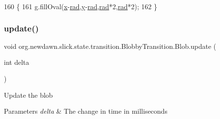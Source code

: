 \begin{DoxyCode}
160                                        \{
161             g.fillOval(\mbox{\hyperlink{classorg_1_1newdawn_1_1slick_1_1state_1_1transition_1_1_blobby_transition_1_1_blob_a5026febe6bf250f540a3c1dd931075e0}{x}}-\mbox{\hyperlink{classorg_1_1newdawn_1_1slick_1_1state_1_1transition_1_1_blobby_transition_1_1_blob_a51823cbba4d39976abf9c6a567c8be5a}{rad}},\mbox{\hyperlink{classorg_1_1newdawn_1_1slick_1_1state_1_1transition_1_1_blobby_transition_1_1_blob_a0880120ef6ca11df411b7e37a69bdad3}{y}}-\mbox{\hyperlink{classorg_1_1newdawn_1_1slick_1_1state_1_1transition_1_1_blobby_transition_1_1_blob_a51823cbba4d39976abf9c6a567c8be5a}{rad}},\mbox{\hyperlink{classorg_1_1newdawn_1_1slick_1_1state_1_1transition_1_1_blobby_transition_1_1_blob_a51823cbba4d39976abf9c6a567c8be5a}{rad}}*2,\mbox{\hyperlink{classorg_1_1newdawn_1_1slick_1_1state_1_1transition_1_1_blobby_transition_1_1_blob_a51823cbba4d39976abf9c6a567c8be5a}{rad}}*2);
162         \}
\end{DoxyCode}
\mbox{\label{classorg_1_1newdawn_1_1slick_1_1state_1_1transition_1_1_blobby_transition_1_1_blob_a7c1bf72bc3cbeccbee6a41b6f0ab4f3f}} 
\subsubsection{\texorpdfstring{update()}{update()}}
{\footnotesize\ttfamily void org.\+newdawn.\+slick.\+state.\+transition.\+Blobby\+Transition.\+Blob.\+update (\begin{DoxyParamCaption}\item[{int}]{delta }\end{DoxyParamCaption})\hspace{0.3cm}{\ttfamily [inline]}}

Update the blob


\begin{DoxyParams}{Parameters}
{\em delta} & The change in time in milliseconds \\
\hline
\end{DoxyParams}

